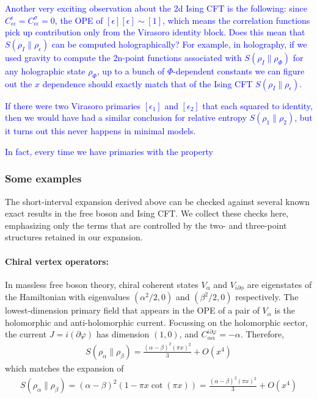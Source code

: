 \documentclass[11pt]{article}
\newcommand{\ep}{\epsilon}
\newcommand{\p}{\partial}
\newcommand{\NL}[1]{\textcolor{blue}{#1}}
\begin{document}
\NL{Another very exciting observation about the 2d Ising CFT is the following: since $C_{\ep\ep}^\ep=C^\sigma_{\ep\ep}=0$, the OPE of $[\ep][\ep]\sim [1]$, which means the correlation functions pick up contribution only from the Virasoro identity block. Does this mean that $S(\rho_I\|\rho_\ep)$ can be computed holographically? For example, in holography, if we used gravity to compute the 2n-point functions associated with $S(\rho_I\|\rho_\Phi)$ for any holographic state $\rho_\Phi$, up to a bunch of $\Phi$-dependent constants we can figure out the $x$ dependence should exactly match that of the Ising CFT $S(\rho_I\|\rho_\ep)$.}

\NL{If there were two Virasoro primaries $[\ep_1]$ and $[\ep_2]$ that each squared to identity, then we would have had a similar conclusion for relative entropy $S(\rho_1\|\rho_2)$, but it turns out this never happens in minimal models.}

\NL{In fact, every time we have primaries with the property }


\subsubsection{Some examples} 
The short-interval expansion derived above can be checked against several
known exact results in the free boson and Ising CFT. We collect these
checks here, emphasizing only the terms that are controlled by the
two- and three-point structures retained in our expansion.
  \paragraph{Chiral vertex operators:}

  In massless free boson theory, chiral coherent states $V_\alpha$ and $V_{i\partial\phi}$ are eigenstates of the Hamiltonian with eigenvalues $(\alpha^2/2,0)$ and $(\beta^2/2,0)$ respectively. The lowest-dimension primary field that appears in the OPE of a pair of $V_\alpha$ is the holomorphic and anti-holomorphic current. Focussing on the holomorphic sector, the current $J=i(\p\varphi)$ has dimension $(1,0)$, and $C^{i\p\varphi}_{\alpha\alpha}=-\alpha$. Therefore,
  \begin{align}
    S(\rho_\alpha\|\rho_\beta)=\frac{(\alpha-\beta)^2(\pi x)^2}{3}+O(x^4)
  \end{align}
  which matches the expansion of 
  \begin{align}
    S(\rho_\alpha\|\rho_\beta)=(\alpha-\beta)^2(1-\pi x\cot(\pi x))=\frac{(\alpha-\beta)^2(\pi x)^2}{3}+O(x^4)
  \end{align}
\end{document}
